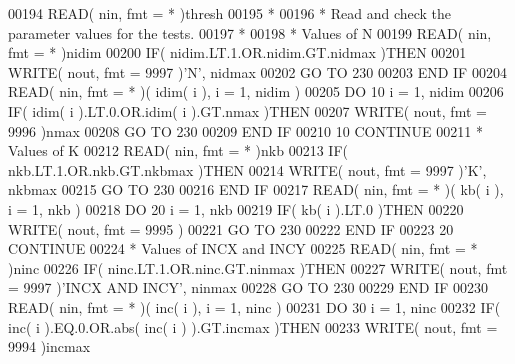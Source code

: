 \begin{DoxyCode}
00194       \textcolor{keyword}{READ}( nin, fmt = * )thresh
00195 \textcolor{comment}{*}
00196 \textcolor{comment}{*     Read and check the parameter values for the tests.}
00197 \textcolor{comment}{*}
00198 \textcolor{comment}{*     Values of N}
00199       \textcolor{keyword}{READ}( nin, fmt = * )nidim
00200       \textcolor{keywordflow}{IF}( nidim.LT.1.OR.nidim.GT.nidmax )\textcolor{keywordflow}{THEN}
00201          \textcolor{keyword}{WRITE}( nout, fmt = 9997 )\textcolor{stringliteral}{'N'}, nidmax
00202          \textcolor{keywordflow}{GO TO} 230
00203 \textcolor{keywordflow}{      END IF}
00204       \textcolor{keyword}{READ}( nin, fmt = * )( idim( i ), i = 1, nidim )
00205       \textcolor{keywordflow}{DO} 10 i = 1, nidim
00206          \textcolor{keywordflow}{IF}( idim( i ).LT.0.OR.idim( i ).GT.nmax )\textcolor{keywordflow}{THEN}
00207             \textcolor{keyword}{WRITE}( nout, fmt = 9996 )nmax
00208             \textcolor{keywordflow}{GO TO} 230
00209 \textcolor{keywordflow}{         END IF}
00210    10 \textcolor{keywordflow}{CONTINUE}
00211 \textcolor{comment}{*     Values of K}
00212       \textcolor{keyword}{READ}( nin, fmt = * )nkb
00213       \textcolor{keywordflow}{IF}( nkb.LT.1.OR.nkb.GT.nkbmax )\textcolor{keywordflow}{THEN}
00214          \textcolor{keyword}{WRITE}( nout, fmt = 9997 )\textcolor{stringliteral}{'K'}, nkbmax
00215          \textcolor{keywordflow}{GO TO} 230
00216 \textcolor{keywordflow}{      END IF}
00217       \textcolor{keyword}{READ}( nin, fmt = * )( kb( i ), i = 1, nkb )
00218       \textcolor{keywordflow}{DO} 20 i = 1, nkb
00219          \textcolor{keywordflow}{IF}( kb( i ).LT.0 )\textcolor{keywordflow}{THEN}
00220             \textcolor{keyword}{WRITE}( nout, fmt = 9995 )
00221             \textcolor{keywordflow}{GO TO} 230
00222 \textcolor{keywordflow}{         END IF}
00223    20 \textcolor{keywordflow}{CONTINUE}
00224 \textcolor{comment}{*     Values of INCX and INCY}
00225       \textcolor{keyword}{READ}( nin, fmt = * )ninc
00226       \textcolor{keywordflow}{IF}( ninc.LT.1.OR.ninc.GT.ninmax )\textcolor{keywordflow}{THEN}
00227          \textcolor{keyword}{WRITE}( nout, fmt = 9997 )\textcolor{stringliteral}{'INCX AND INCY'}, ninmax
00228          \textcolor{keywordflow}{GO TO} 230
00229 \textcolor{keywordflow}{      END IF}
00230       \textcolor{keyword}{READ}( nin, fmt = * )( inc( i ), i = 1, ninc )
00231       \textcolor{keywordflow}{DO} 30 i = 1, ninc
00232          \textcolor{keywordflow}{IF}( inc( i ).EQ.0.OR.abs( inc( i ) ).GT.incmax )\textcolor{keywordflow}{THEN}
00233             \textcolor{keyword}{WRITE}( nout, fmt = 9994 )incmax

\end{DoxyCode}
